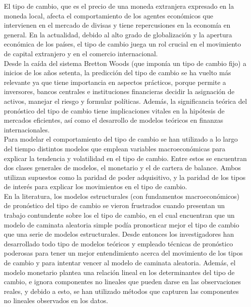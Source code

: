 El tipo de cambio, que es el precio de una moneda extranjera expresado en la moneda local, afecta el comportamiento de los agentes económicos que intervienen en el mercado de divisas y tiene repercusiones en la economía en general. En la actualidad, debido al alto grado de globalización y la apertura económica de los países, el tipo de cambio juega un rol crucial en el movimiento de capital extranjero y en el comercio internacional.\\

Desde la caída del sistema Bretton Woods (que imponía un tipo de cambio fijo) a inicios de los años setenta, la predicción del tipo de cambio se ha vuelto más relevante ya que tiene importancia en aspectos prácticos, porque permite a inversores, bancos centrales e instituciones financieras decidir la asignación de activos, manejar el riesgo y formular políticas. Además, la significancia teórica del pronóstico del tipo de cambio tiene implicaciones vitales en la hipótesis de mercados eficientes, así como el desarrollo de modelos teóricos en finanzas internacionales.\\

Para modelar el comportamiento del tipo de cambio se han utilizado a lo largo del tiempo distintos modelos que emplean variables macroeconómicas para explicar la tendencia y volatilidad en el tipo de cambio. Entre estos se encuentran dos clases generales de modelos, el monetario y el de cartera de balance. Ambos utilizan supuestos como la paridad de poder adquisitivo, y la paridad de los tipos de interés para explicar los movimientos en el tipo de cambio.\\

En la literatura, los modelos estructurales (con fundamentos macroeconómicos) de pronóstico del tipo de cambio se vieron frustrados cuando \textcite{meese1983empirical} presentan un trabajo contundente sobre los el tipo de cambio, en el cual encuentran que un modelo de caminata aleatoria simple podía pronosticar mejor el tipo de cambio que una serie de modelos estructurales. Desde entonces los investigadores han desarrollado todo tipo de modelos teóricos y empleado técnicas de pronóstico poderosas para tener un mejor entendimiento acerca del movimiento de los tipos de cambio y para intentar vencer al modelo de caminata aleatoria. Además, el modelo monetario plantea una relación lineal en los determinantes del tipo de cambio, e ignora componentes no lineales que pueden darse en las observaciones reales, y debido a esto, se han utilizado métodos que capturen las componentes no lineales observados en los datos.\\

